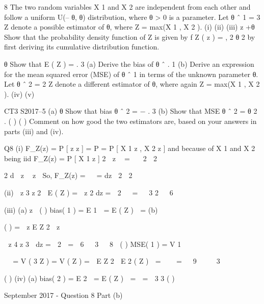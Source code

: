 \documentclass[a4paper,12pt]{article}
\begin{document}
8
The two random variables X 1 and X 2 are independent from each other and follow a
uniform U(– θ, θ) distribution, where θ > 0 is a parameter.
Let θ ˆ 1 = 3 Z denote a possible estimator of θ, where Z = max(X 1 , X 2 ).
(i)
(ii)
(iii)
z +θ
Show that the probability density function of Z is given by f Z ( z ) =
,
2 θ 2
by first deriving its cumulative distribution function.

θ
Show that E ( Z ) = .
3
(a)
Derive the bias of θ ˆ .
1
(b)
Derive an expression for the mean squared error (MSE) of θ ˆ 1 in terms
of the unknown parameter θ.
Let θ ˆ 2 = 2 Z denote a different estimator of θ, where again Z = max(X 1 , X 2 ).
(iv)
(v)

CT3 S2017–5
(a) θ
Show that bias θ ˆ 2 = − .
3
(b) Show that MSE θ ˆ 2 = θ 2 .
( )
( )
Comment on how good the two estimators are, based on your answers in parts
(iii) and (iv).




Q8
(i)
F_Z(z) \;=\; P [ z \leq z ] \;=\; P  \;=\; P [ X 1 \leq z , X 2 \leq z ] 
and because of X 1 and X 2 being iid 
F_Z(z) \;=\; P [ X 1 \leq z ]
2
 z \theta 
\;=\;

 2 \theta 
2

2
d  z \theta 
z \theta
So, F_Z(z) \;=\; 
 \;=\;
dz  2 \theta 
2 
\theta

\theta
(ii)  z 3 z 2 
\theta
E ( Z ) \;=\;  z 2 dz \;=\;  2   \;= \theta  
3
2 \theta
  6 \theta
\theta
\theta

(iii) (a)
z \theta
( )
bias( \hat{\theta}1 ) \;=\; E \hat{\theta}1  \theta \;= E ( Z )  \theta \;=
\theta
(b)

( ) \;=\;  z
E Z
2

z  

\theta
 z 4 z 3 
dz \;=\;  2 
\;=\;

6 \theta  
3
  8 \theta
\theta
( )
MSE( \hat{\theta}1 ) \;=\; V \hat{\theta}1


   
\;=\; V ( 3 Z ) \;= V ( Z ) \;=  E Z 2  E 2 ( Z )  \;=    \;= 


9  
  3


( )
(iv)
(a)
\theta
\theta
bias( \hat{\theta}2 ) \;=\; E \hat{\theta}2  \theta \;= E ( Z )  \theta \;=  \theta \;=\; 
3
3
( )

September 2017 - Question 8
Part (b)
\end{document}
